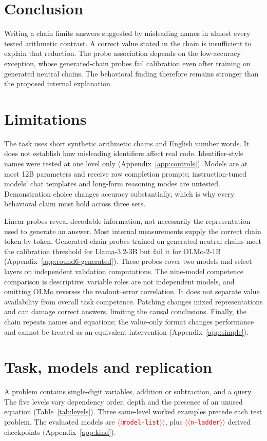 \documentclass[11pt]{article}
\providecommand{\NUM}[1]{\textcolor{red}{$\langle\langle$\texttt{#1}$\rangle\rangle$}}
\begin{document}
\section{Conclusion}

Writing a chain limits answers suggested by misleading names in almost every tested arithmetic contrast.
A correct value stated in the chain is insufficient to explain that reduction. The probe
association depends on the low-accuracy exception, whose generated-chain probes fail calibration
even after training on generated neutral chains.
The behavioral finding therefore remains stronger than the proposed internal explanation.

\section*{Limitations}

The task uses short synthetic arithmetic chains and English number words. It does not establish
how misleading identifiers affect real code. Identifier-style names were tested at one level
only (Appendix~\ref{app:controls}). Models are at most 12B parameters and receive raw completion
prompts; instruction-tuned models' chat templates and long-form reasoning modes are untested.
Demonstration choice changes accuracy substantially, which is why every behavioral claim must
hold across three sets.

Linear probes reveal decodable information, not necessarily the representation used to generate
an answer. Most internal measurements supply the correct chain token by token. Generated-chain
probes trained on generated neutral chains meet the calibration threshold for Llama-3.2-3B
but fail it for OLMo-2-1B (Appendix~\ref{app:round6-generated}). These probes cover two models
and select layers on independent validation computations. The nine-model competence comparison is descriptive;
variable roles are not independent models, and omitting OLMo reverses the readout--error
correlation. It does not separate value availability from overall task competence.
Patching changes mixed representations and can damage
correct answers, limiting the causal conclusions. Finally, the chain repeats names and equations;
the value-only format changes performance and cannot be treated as an equivalent intervention
(Appendix~\ref{app:simple}).



\appendix

\section{Task, models and replication}
\label{app:task}
A problem contains single-digit variables, addition or subtraction, and a query. The five
levels vary dependency order, depth and the presence of an unused equation
(Table~\ref{tab:levels}). Three same-level worked examples precede each test problem.
The evaluated models are \NUM{model-list}, plus \NUM{n-ladder} derived checkpoints
(Appendix~\ref{app:kind}).
\end{document}
